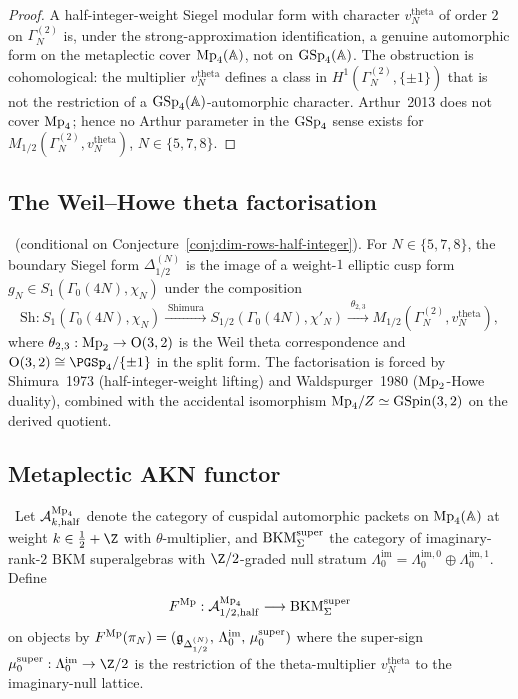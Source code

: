 \begin{proof}
A half-integer-weight Siegel modular form with character
$v^{\mathrm{theta}}_N$ of order $2$ on $\Gamma^{(2)}_N$ is, under the
strong-approximation identification, a genuine automorphic form on the
metaplectic cover $\mathrm{Mp}_4(\mathbb{A})$, not on $\mathrm{GSp}_4(\mathbb{A})$.  The obstruction is
cohomological: the multiplier $v^{\mathrm{theta}}_N$ defines a class in
$H^1(\Gamma^{(2)}_N, \{\pm 1\})$ that is not the restriction of a
$\mathrm{GSp}_4(\mathbb{A})$-automorphic character.  Arthur~2013 does not cover $\mathrm{Mp}_4$;
hence no Arthur parameter in the $\mathrm{GSp}_4$ sense exists for
$M_{1/2}(\Gamma^{(2)}_N, v^{\mathrm{theta}}_N)$, $N \in \{5, 7, 8\}$.
\end{proof}

\subsection{The Weil--Howe theta factorisation}

\begin{theorem}
\label{wn:thm:akn-boundary-weil-howe-factorisation}
\ClaimStatusTheorem\ \textup{(conditional on
Conjecture~\ref{conj:dim-rows-half-integer})}.
For $N \in \{5, 7, 8\}$, the boundary Siegel form $\Delta^{(N)}_{1/2}$
is the image of a weight-$1$ elliptic cusp form $g_N \in
S_1(\Gamma_0(4N), \chi_N)$ under the composition
\[
\mathrm{Sh}: S_1(\Gamma_0(4N), \chi_N)
\xrightarrow{\;\text{Shimura}\;}
S_{1/2}(\Gamma_0(4N), \chi'_N)
\xrightarrow{\;\theta_{2,3}\;}
M_{1/2}(\Gamma^{(2)}_N, v^{\mathrm{theta}}_N),
\]
where $\theta_{2,3}: \mathrm{Mp}_2 \to \mathrm{O}(3,2)$ is the Weil theta
correspondence and $\mathrm{O}(3,2) \cong \PGSp_4 /\{\pm 1\}$ in the
split form.  The factorisation is forced by Shimura~1973
(half-integer-weight lifting) and Waldspurger~1980 ($\mathrm{Mp}_2$-Howe
duality), combined with the accidental isomorphism
$\mathrm{Mp}_4 / Z \simeq \mathrm{GSpin}(3, 2)$ on the derived quotient.
\end{theorem}

\subsection{Metaplectic AKN functor}

\begin{definition}
\label{wn:def:akn-metaplectic-functor}
\ClaimStatusAxiomatic\ Let $\mathcal{A}^{\mathrm{Mp}_4}_{k, \mathrm{half}}$ denote the
category of cuspidal automorphic packets on $\mathrm{Mp}_4(\mathbb{A})$ at weight
$k \in \tfrac12 + \Z$ with $\theta$-multiplier, and
$\mathrm{BKM}^{\mathrm{super}}_\Sigma$ the category of imaginary-rank-$2$ BKM
superalgebras with $\Z/2$-graded null stratum
$\Lambda^{\mathrm{im}}_0 = \Lambda^{\mathrm{im}, 0}_0
\oplus \Lambda^{\mathrm{im}, 1}_0$.  Define
\[
F^{\mathrm{Mp}}: \mathcal{A}^{\mathrm{Mp}_4}_{1/2, \mathrm{half}}
\longrightarrow \mathrm{BKM}^{\mathrm{super}}_\Sigma
\]
on objects by $F^{\mathrm{Mp}}(\pi_N) = (\mathfrak{g}_{\Delta^{(N)}_{1/2}},\,
\Lambda^{\mathrm{im}}_0,\, \mu_0^{\mathrm{super}})$ where the super-sign
$\mu_0^{\mathrm{super}}: \Lambda^{\mathrm{im}}_0 \to \Z/2$ is the
restriction of the theta-multiplier $v^{\mathrm{theta}}_N$ to the
imaginary-null lattice.
\end{definition}

